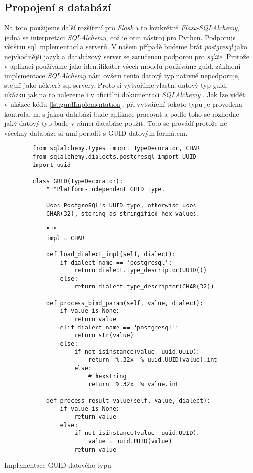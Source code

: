 \subsection{Propojení s databází}

Na toto použijeme další rozšíření pro \textit{Flask} a to konkrétně \textit{Flask-SQLAlchemy}, jedná se interpretaci \textit{SQLAlchemy}, což je \gls{orm} nástroj pro Python.
Podporuje většinu \gls{sql} implementací a serverů. V našem případě budeme brát \textit{postgresql} jako nejvhodnější jazyk a databázový server se zaručenou podporou pro \textit{sqlite}. Protože
v aplikaci používáme jako identifikátor všech modelů používáme \gls{guid}, základní implementace \textit{SQLAlchemy} nám ovšem tento datový typ nativně nepodporuje, stejně jako
některé \gls{sql} servery. Proto si vytvoříme vlastní datový typ \gls{guid}, ukázku jak na to nalezeme i v oficiální dokumentaci \textit{SQLAlchemy} \cite{sqlalchemyGuid}. Jak lze
vidět v ukázce kódu \ref{lst:guidImplementation}, při vytváření tohoto typu je provedena kontrola, na s jakou databází bude aplikace pracovat a podle toho se rozhodne jaký datový typ
bude v rámci databáze použit. Toto se provádí protože ne všechny databáze si umí poradit s GUID datovým formátem.

\begin{listing}
    \begin{verbatim}
        from sqlalchemy.types import TypeDecorator, CHAR
        from sqlalchemy.dialects.postgresql import UUID
        import uuid

        class GUID(TypeDecorator):
            """Platform-independent GUID type.

            Uses PostgreSQL's UUID type, otherwise uses
            CHAR(32), storing as stringified hex values.

            """
            impl = CHAR

            def load_dialect_impl(self, dialect):
                if dialect.name == 'postgresql':
                    return dialect.type_descriptor(UUID())
                else:
                    return dialect.type_descriptor(CHAR(32))

            def process_bind_param(self, value, dialect):
                if value is None:
                    return value
                elif dialect.name == 'postgresql':
                    return str(value)
                else:
                    if not isinstance(value, uuid.UUID):
                        return "%.32x" % uuid.UUID(value).int
                    else:
                        # hexstring
                        return "%.32x" % value.int

            def process_result_value(self, value, dialect):
                if value is None:
                    return value
                else:
                    if not isinstance(value, uuid.UUID):
                        value = uuid.UUID(value)
                    return value
    \end{verbatim}
    \caption{Implementace GUID datového typu}
    \label{lst:guidImplementation}
\end{listing}

